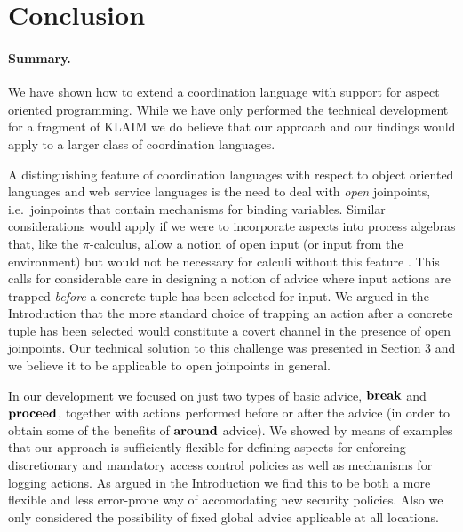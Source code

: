 \documentclass[a4paper]{llncs}
\begin{document}


\section{Conclusion}\label{sec:conclusion}

\paragraph{Summary.}

We have shown how to extend a coordination language with support for
aspect oriented programming. While we have only performed the
technical development for a fragment of KLAIM we do believe that our
approach and our findings would apply to a larger class of
coordination languages.

A distinguishing feature of coordination languages with respect to
object oriented languages and web service languages \cite{CharfiM04} is the need to deal with \emph{open}
joinpoints, i.e.~joinpoints that contain mechanisms for binding
variables.  Similar considerations would apply if we were to
incorporate aspects into process algebras that, like the
$\pi$-calculus, allow a notion of open input (or input from the
environment) but would not be necessary for calculi without this feature
\cite{andrews2001paf,bruns2004muma,jagadeesan2003cua,walker2003ta,Wand2004}.
This calls for considerable care in designing a notion of advice where
input actions are trapped \emph{before} a concrete tuple has been
selected for input. We argued in the Introduction that the more
standard choice of trapping an action after a concrete tuple has been
selected would constitute a covert channel in the presence of open
joinpoints.  Our technical solution to this challenge was presented in
Section 3 and we believe it to be applicable to open joinpoints in
general.

In our development we focused on just two types of basic advice, ${\bf
break}$ and ${\bf proceed}$, together with actions performed before or
after the advice (in order to obtain some of the benefits of ${\bf
around}$ advice).  We showed by means of examples that our approach is
sufficiently flexible for defining aspects for enforcing discretionary
and mandatory access control policies as well as mechanisms for
logging actions. As argued in the Introduction we find this to be both
a more flexible and less error-prone way of accomodating new security
policies. Also we only considered the possibility of fixed global advice
applicable at all locations. 
\end{document}
